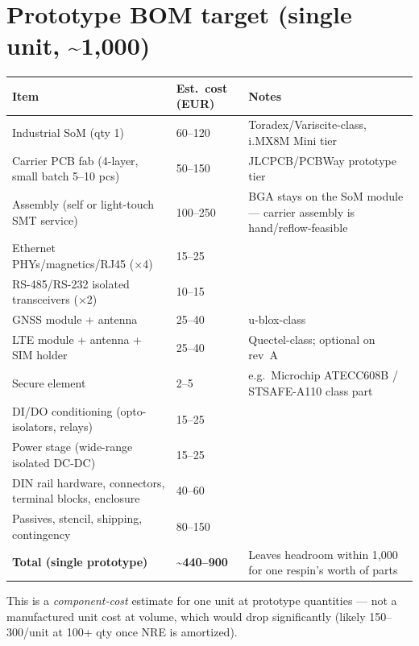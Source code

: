 \documentclass[11pt,a4paper]{article}
\begin{document}
\section{Prototype BOM target (single unit, \textasciitilde{}\EUR{}1{,}000)}

\begin{tabularx}{\linewidth}{@{}l>{\raggedright\arraybackslash}X>{\raggedright\arraybackslash}X@{}}
\toprule
\textbf{Item} & \textbf{Est.\ cost (EUR)} & \textbf{Notes} \\
\midrule
Industrial SoM (qty 1) & \EUR{}60--120 & Toradex/Variscite-class, i.MX8M Mini tier \\
Carrier PCB fab (4-layer, small batch 5--10 pcs) & \EUR{}50--150 & JLCPCB/PCBWay prototype tier \\
Assembly (self or light-touch SMT service) & \EUR{}100--250 & BGA stays on the SoM module --- carrier assembly is hand/reflow-feasible \\
Ethernet PHYs/magnetics/RJ45 ($\times$4) & \EUR{}15--25 & \\
RS-485/RS-232 isolated transceivers ($\times$2) & \EUR{}10--15 & \\
GNSS module + antenna & \EUR{}25--40 & u-blox-class \\
LTE module + antenna + SIM holder & \EUR{}25--40 & Quectel-class; optional on rev~A \\
Secure element & \EUR{}2--5 & e.g.\ Microchip ATECC608B / STSAFE-A110 class part \\
DI/DO conditioning (opto-isolators, relays) & \EUR{}15--25 & \\
Power stage (wide-range isolated DC-DC) & \EUR{}15--25 & \\
DIN rail hardware, connectors, terminal blocks, enclosure & \EUR{}40--60 & \\
Passives, stencil, shipping, contingency & \EUR{}80--150 & \\
\midrule
\textbf{Total (single prototype)} & \textbf{\textasciitilde{}\EUR{}440--900} & Leaves headroom within \EUR{}1{,}000 for one respin's worth of parts \\
\bottomrule
\end{tabularx}

\vspace{0.75em}
\noindent
This is a \emph{component-cost} estimate for one unit at prototype quantities --- not a manufactured unit cost at volume,
which would drop significantly (likely \EUR{}150--300/unit at 100+ qty once NRE is amortized).
\end{document}
